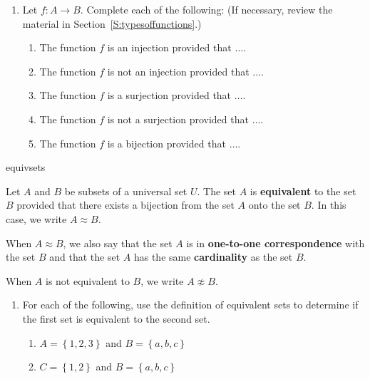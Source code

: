 %
\begin{previewactivity}\label{PA:equivalentsets} \hfill
\begin{enumerate}
\item Let $f:A \to B$.  Complete each of the following:  (If necessary, review the material in Section~\ref{S:typesoffunctions}.)
\begin{enumerate}
\item The function $f$ is an injection provided that $\ldots .$
\item The function $f$ is not an injection provided that $\ldots .$
\item The function $f$ is a surjection provided that $\ldots .$
\item The function $f$ is not a surjection provided that $\ldots .$
\item The function $f$ is a bijection provided that $\ldots .$
\end{enumerate}
\end{enumerate}

\begin{defbox}{equivsets}{Let $A$ and $B$ be subsets of a universal set $U$.  The set $A$ is \textbf{equivalent} to the set $B$ 
%
provided that there exists a bijection from the set $A$ onto the set $B$.  In this case, we write 
$A \approx B$.  
\label{sym:AequivB}%

\vskip6pt
When $A \approx B$, we also say that the set $A$ is in \textbf{one-to-one correspondence} 
%
with the set $B$ and that the set $A$ has the same \textbf{cardinality} 
%
as the set $B$.
}
\end{defbox}
\noindent
\note  When $A$ is not equivalent to $B$, we write $A \not \approx B$.

\begin{enumerate} \addtocounter{enumi}{1}
\item For each of the following, use the definition of equivalent sets to determine if the first set is equivalent to the second set.

\begin{enumerate}
\item $A = \left\{ 1, 2, 3 \right\}$ and $B = \left\{ a, b, c \right\}$  

\item $C = \left\{ 1, 2 \right\}$ and $B = \left\{ a, b, c \right\}$  


\end{enumerate}
\end{enumerate}
\end{previewactivity}
